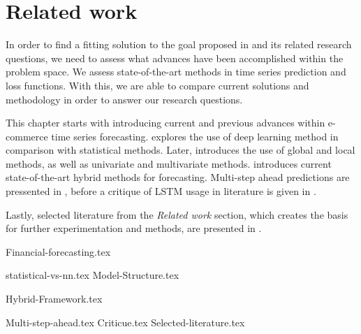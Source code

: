 \chapter{Related work}
\label{section:RelatedWork}

In order to find a fitting solution to the goal proposed in  and its related research questions,
we need to assess what advances have been accomplished within the problem space.
We assess state-of-the-art methods in time series prediction and loss functions.
With this, we are able to compare current solutions and methodology in order to answer our research questions.

This chapter starts with  introducing current and previous advances within e-commerce time series forecasting.
 explores the use of deep learning method in comparison with statistical methods.
Later,  introduces the use of global and local methods, as well as univariate and multivariate methods.
 introduces current state-of-the-art hybrid methods for forecasting.
Multi-step ahead predictions are pressented in ,
before a critique of LSTM usage in literature is given in .

Lastly, selected literature from the \textit{Related work} section, which creates the basis for further experimentation and methods,
 are presented in .



{Financial-forecasting.tex}

{statistical-vs-nn.tex}
{Model-Structure.tex}

{Hybrid-Framework.tex}

{Multi-step-ahead.tex}
{Criticue.tex}
{Selected-literature.tex}

